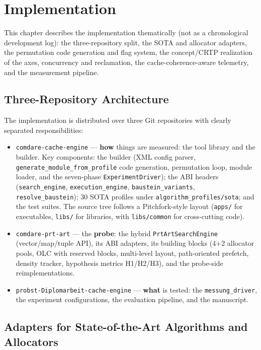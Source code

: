 \chapter{Implementation}\label{ch:impl}

This chapter describes the implementation thematically (not as a chronological development
log): the three-repository split, the SOTA and allocator adapters, the permutation code
generation and flag system, the concept/CRTP realization of the axes, concurrency and
reclamation, the cache-coherence-aware telemetry, and the measurement pipeline.

\section{Three-Repository Architecture}\label{sec:repos}

The implementation is distributed over three Git repositories with clearly separated
responsibilities:

\begin{itemize}
  \item \texttt{comdare-cache-engine} --- \textbf{how} things are measured: the tool
        library and the builder. Key components: the builder (XML config parser,
        \texttt{generate\_module\_from\_profile} code generation, permutation loop, module
        loader, and the seven-phase \texttt{ExperimentDriver}); the ABI headers
        (\texttt{search\_engine}, \texttt{execution\_engine}, \texttt{baustein\_variants},
        \texttt{resolve\_baustein}); 30 SOTA profiles under
        \texttt{algorithm\_profiles/sota}; and the test suites. The source tree follows a
        Pitchfork-style layout (\texttt{apps/} for executables, \texttt{libs/} for
        libraries, with \texttt{libs/common} for cross-cutting code).
  \item \texttt{comdare-prt-art} --- the \textbf{probe}: the hybrid
        \texttt{PrtArtSearchEngine} (vector/map/tuple API), its ABI adapters, its building
        blocks (4+2 allocator pools, OLC with reserved blocks, multi-level layout,
        path-oriented prefetch, density tracker, hypothesis metrics H1/H2/H3), and the
        probe-side reimplementations.
  \item \texttt{probst-Diplomarbeit-cache-engine} --- \textbf{what} is tested: the
        \texttt{messung\_driver}, the experiment configurations, the evaluation pipeline,
        and the manuscript.
\end{itemize}

\section{Adapters for State-of-the-Art Algorithms and Allocators}\label{sec:adapters}

